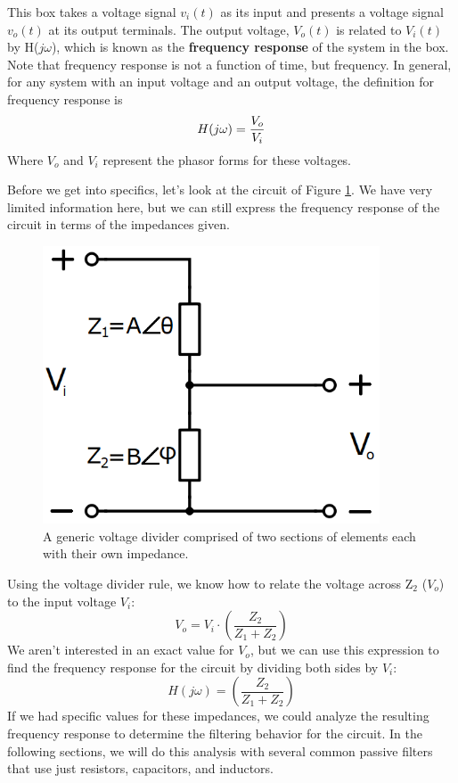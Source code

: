 This box takes a voltage signal $v_i(t)$ as its input and presents a voltage signal $v_o(t)$ at its output terminals. The output voltage, $V_o(t)$ is related to $V_i(t)$ by H($j\omega$), which is known as the \textbf{frequency response} of the system in the box. Note that frequency response is not a function of time, but frequency. In general, for any system with an input voltage and an output voltage, the definition for frequency response is
$$
\mathnormal{H(j\omega)} = \frac{V_o}{V_i}
$$
Where $V_o$ and $V_i$ represent the phasor forms for these voltages. 
\par
Before we get into specifics, let's look at the circuit of Figure \ref{voltageDivWithBoxElements}. We have very limited information here, but we can still express the frequency response of the circuit in terms of the impedances given. 
\begin{figure}[h!]
\centering
\includegraphics[width=10cm]{figures/voltageDivBoxes.png}
\caption{A generic voltage divider comprised of two sections of elements each with their own impedance.}
\label{voltageDivWithBoxElements}
\end{figure}
Using the voltage divider rule, we know how to relate the voltage across Z$_2$ ($V_o$) to the input voltage $V_i$:
$$
V_o = V_i\cdot\left(\frac{Z_2}{Z_1+Z_2}\right)
$$
We aren't interested in an exact value for $V_o$, but we can use this expression to find the frequency response for the circuit by dividing both sides by $V_i$:
$$
H(j\omega) = \left(\frac{Z_2}{Z_1+Z_2}\right)
$$
If we had specific values for these impedances, we could analyze the resulting frequency response to determine the filtering behavior for the circuit. In the following sections, we will do this analysis with several common passive filters that use just resistors, capacitors, and inductors.

